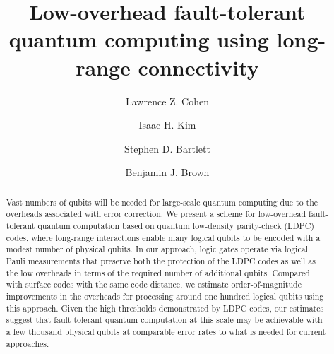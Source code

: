 \documentclass[reprint,
superscriptaddress,
 amsmath,amssymb,
 aps, longbibliography
]{revtex4-1}
\newcommand{\rev}[1]{{#1}}
\begin{document}
\title{Low-overhead fault-tolerant quantum computing using long-range connectivity}
\author{Lawrence Z. Cohen}

\author{Isaac H. Kim}

\author{Stephen D. Bartlett}

\author{Benjamin J. Brown}

\begin{abstract}
    Vast numbers of qubits will be needed for large-scale quantum computing due to the overheads associated with error correction. We present a scheme for low-overhead fault-tolerant quantum computation based on quantum low-density parity-check (LDPC) codes, where long-range interactions enable many logical qubits to be encoded with a modest number of physical qubits.  In our approach, logic gates operate via logical Pauli measurements that preserve both the protection of the LDPC codes as well as the low overheads in terms of the required number of additional qubits. Compared with surface codes with the same code distance, we estimate order-of-magnitude improvements in the overheads for processing around one hundred logical qubits using this approach. \rev{Given the high thresholds demonstrated by LDPC codes, our estimates suggest that fault-tolerant quantum computation at this scale may be achievable with a few thousand physical qubits at comparable error rates to what is needed for current approaches.} \\
    
\end{abstract}

\maketitle
\end{document}
